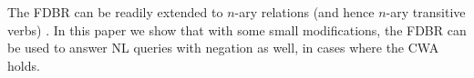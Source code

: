 \documentclass[../main.tex]{subfiles}
\begin{document}
\begin{refsection}
\begin{equation*}
\end{equation*}
The FDBR can be readily extended to $n$-ary relations (and hence $n$-ary transitive verbs) \cite{peelar2020compositional}. In this paper we show that with some small modifications, the FDBR can be used to answer NL queries with negation as well, in cases where the CWA holds.
%
%

%
%


\end{refsection}
\end{document}
